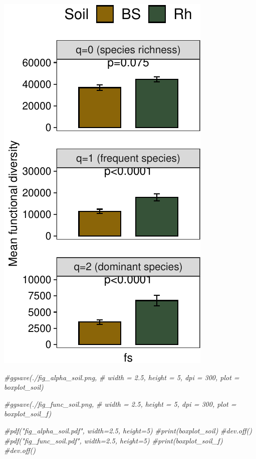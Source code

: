 \documentclass[]{interact}
\theoremstyle{plain}%
\theoremstyle{definition}
\theoremstyle{remark}
\newenvironment{Shaded}{\begin{snugshade}}{\end{snugshade}}
\newcommand{\CommentTok}[1]{\textcolor[rgb]{0.56,0.35,0.01}{\textit{#1}}}
\begin{document}
\begin{center}\includegraphics{Doc_pdf_files/figure-latex/unnamed-chunk-22-2} \end{center}

\begin{Shaded}
\begin{Highlighting}[]
\CommentTok{\#ggsave(\textquotesingle{}./fig\_alpha\_soil.png\textquotesingle{},}
 \CommentTok{\#   width = 2.5, height = 5, dpi = 300, plot = boxplot\_soil)}

\CommentTok{\#ggsave(\textquotesingle{}./fig\_func\_soil.png\textquotesingle{},}
 \CommentTok{\#      width = 2.5, height = 5, dpi = 300, plot = boxplot\_soil\_f)}

\CommentTok{\#pdf("fig\_alpha\_soil.pdf", width=2.5, height=5)}
\CommentTok{\#print(boxplot\_soil)}
\CommentTok{\#dev.off()}
\CommentTok{\#pdf("fig\_func\_soil.pdf", width=2.5, height=5)}
\CommentTok{\#print(boxplot\_soil\_f)}
\CommentTok{\#dev.off()}
\end{Highlighting}
\end{Shaded}
\end{document}
